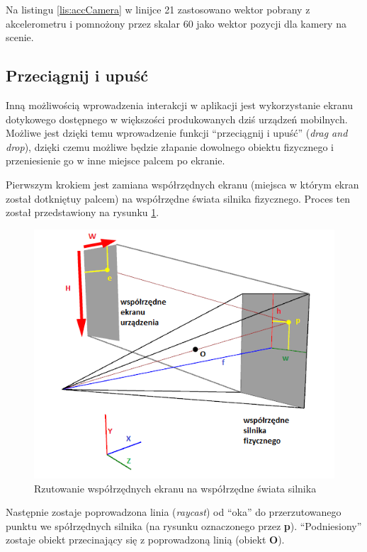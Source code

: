 Na listingu \ref{lis:accCamera} w linijce 21 zastosowano wektor pobrany z
akcelerometru i pomnożony przez skalar 60 jako wektor pozycji dla kamery na
scenie.

\subsection{Przeciągnij i upuść}\label{sec:dragAndDrop}
Inną możliwością wprowadzenia interakcji w aplikacji jest wykorzystanie ekranu
dotykowego dostępnego w większości produkowanych dziś urządzeń mobilnych.
Możliwe jest dzięki temu wprowadzenie funkcji ``przeciągnij i upuść''
(\emph{drag and drop}), dzięki czemu możliwe będzie złapanie dowolnego obiektu
fizycznego i przeniesienie go w inne miejsce palcem po ekranie.

Pierwszym krokiem jest zamiana współrzędnych ekranu (miejsca w którym ekran
został dotkniętuy palcem) na współrzędne świata silnika fizycznego. Proces ten
został przedstawiony na rysunku \ref{fig:raycast}.

\begin{figure}
\centering
\includegraphics[scale = 0.8]{./img/Rzutowanie.png}
\caption{Rzutowanie współrzędnych ekranu na współrzędne świata silnika}
\label{fig:raycast}
\end{figure}

Następnie zostaje poprowadzona linia (\emph{raycast}) od ``oka'' do
przerzutowanego punktu we spółrzędnych silnika (na rysunku
oznaczonego przez \textbf{p}). ``Podniesiony'' zostaje obiekt przecinający się z
poprowadzoną linią (obiekt \textbf{O}).

